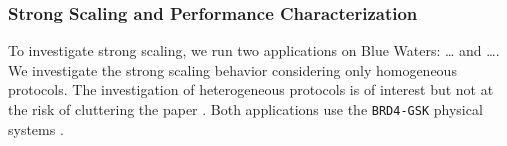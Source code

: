 
\subsubsection{Strong Scaling and Performance Characterization}


To investigate strong scaling, we run two applications on Blue Waters: \ldots
and \ldots {}. We investigate the
strong scaling behavior considering only homogeneous protocols. The
investigation of heterogeneous protocols is of interest but not at the risk
of cluttering the paper . Both applications use the \texttt{BRD4-GSK} physical
systems .

